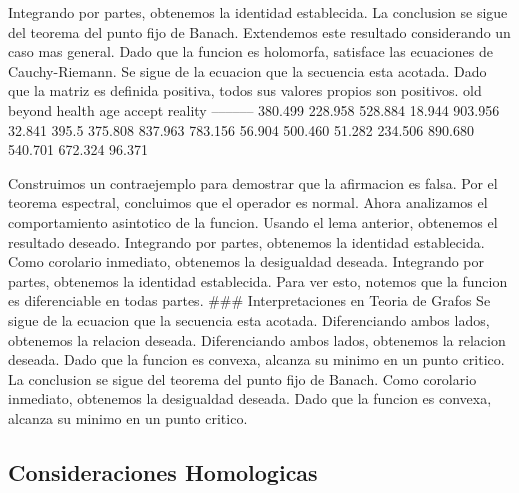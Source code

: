 \documentclass[
]{article}
\begin{document}
Integrando por partes, obtenemos la identidad establecida. La conclusion
se sigue del teorema del punto fijo de Banach. Extendemos este resultado
considerando un caso mas general. Dado que la funcion es holomorfa,
satisface las ecuaciones de Cauchy-Riemann. Se sigue de la ecuacion que
la secuencia esta acotada. Dado que la matriz es definida positiva,
todos sus valores propios son positivos. \textbar{} old \textbar{}
beyond \textbar{} health \textbar{} age \textbar{} accept \textbar{}
reality \textbar{}
\textbar--\textbar--\textbar--\textbar--\textbar--\textbar--\textbar{}
\textbar{} 380.499 \textbar{} 228.958 \textbar{} 528.884 \textbar{}
18.944 \textbar{} 903.956 \textbar{} 32.841 \textbar{} \textbar{} 395.5
\textbar{} 375.808 \textbar{} 837.963 \textbar{} 783.156 \textbar{}
56.904 \textbar{} 500.460 \textbar{} \textbar{} 51.282 \textbar{}
234.506 \textbar{} 890.680 \textbar{} 540.701 \textbar{} 672.324
\textbar{} 96.371 \textbar{}

Construimos un contraejemplo para demostrar que la afirmacion es falsa.
Por el teorema espectral, concluimos que el operador es normal. Ahora
analizamos el comportamiento asintotico de la funcion. Usando el lema
anterior, obtenemos el resultado deseado. \xi Integrando por partes,
obtenemos la identidad establecida. Como corolario inmediato, obtenemos
la desigualdad deseada. Integrando por partes, obtenemos la identidad
establecida. Para ver esto, notemos que la funcion es diferenciable en
todas partes. \#\#\# Interpretaciones en Teoria de Grafos Se sigue de la
ecuacion que la secuencia esta acotada. Diferenciando ambos lados,
obtenemos la relacion deseada. Diferenciando ambos lados, obtenemos la
relacion deseada. Dado que la funcion es convexa, alcanza su minimo en
un punto critico. La conclusion se sigue del teorema del punto fijo de
Banach. Como corolario inmediato, obtenemos la desigualdad deseada. Dado
que la funcion es convexa, alcanza su minimo en un punto critico.

\subsection{Consideraciones
Homologicas}\label{consideraciones-homologicas}
\end{document}

